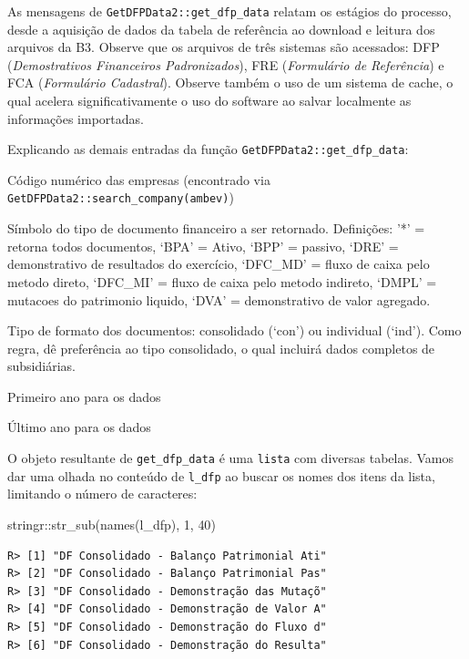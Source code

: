 \documentclass[
  11pt,
]{book}
\newenvironment{Shaded}{\begin{snugshade}}{\end{snugshade}}
\newcommand{\DecValTok}[1]{\textcolor[rgb]{0.06,0.06,0.06}{#1}}
\newcommand{\FunctionTok}[1]{\textcolor[rgb]{0,0,0}{#1}}
\newcommand{\NormalTok}[1]{#1}
\newcommand{\SpecialCharTok}[1]{\textcolor[rgb]{0,0,0}{#1}}
\providecommand{\tightlist}{%
  \setlength{\itemsep}{0pt}\setlength{\parskip}{0pt}}
\begin{document}
As mensagens de \texttt{GetDFPData2::get\_dfp\_data} relatam os estágios do processo, desde a aquisição de dados da tabela de referência ao download e leitura dos arquivos da B3. Observe que os arquivos de três sistemas são acessados: DFP (\emph{Demostrativos Financeiros Padronizados}), FRE (\emph{Formulário de Referência}) e FCA (\emph{Formulário Cadastral}). Observe também o uso de um sistema de cache, o qual acelera significativamente o uso do software ao salvar localmente as informações importadas.

Explicando as demais entradas da função \texttt{GetDFPData2::get\_dfp\_data}:

\begin{description}
\tightlist
\item[companies\_cvm\_codes]
Código numérico das empresas (encontrado via \texttt{GetDFPData2::search\_company(\textquotesingle{}ambev\textquotesingle{})})
\item[type\_docs]
Símbolo do tipo de documento financeiro a ser retornado. Definições: '*' = retorna todos documentos, `BPA' = Ativo, `BPP' = passivo, `DRE' = demonstrativo de resultados do exercício, `DFC\_MD' = fluxo de caixa pelo metodo direto, `DFC\_MI' = fluxo de caixa pelo metodo indireto, `DMPL' = mutacoes do patrimonio liquido, `DVA' = demonstrativo de valor agregado.
\item[type\_format]
Tipo de formato dos documentos: consolidado (`con') ou individual (`ind'). Como regra, dê preferência ao tipo consolidado, o qual incluirá dados completos de subsidiárias.
\item[first\_year]
Primeiro ano para os dados
\item[last\_year]
Último ano para os dados
\end{description}

O objeto resultante de \texttt{get\_dfp\_data} é uma \texttt{lista} com diversas tabelas. Vamos dar uma olhada no conteúdo de \texttt{l\_dfp} ao buscar os nomes dos itens da lista, limitando o número de caracteres:

\begin{Shaded}
\begin{Highlighting}[]
\NormalTok{stringr}\SpecialCharTok{::}\FunctionTok{str\_sub}\NormalTok{(}\FunctionTok{names}\NormalTok{(l\_dfp), }\DecValTok{1}\NormalTok{, }\DecValTok{40}\NormalTok{)}
\end{Highlighting}
\end{Shaded}

\begin{verbatim}
R> [1] "DF Consolidado - Balanço Patrimonial Ati"
R> [2] "DF Consolidado - Balanço Patrimonial Pas"
R> [3] "DF Consolidado - Demonstração das Mutaçõ"
R> [4] "DF Consolidado - Demonstração de Valor A"
R> [5] "DF Consolidado - Demonstração do Fluxo d"
R> [6] "DF Consolidado - Demonstração do Resulta"
\end{verbatim}
\end{document}
